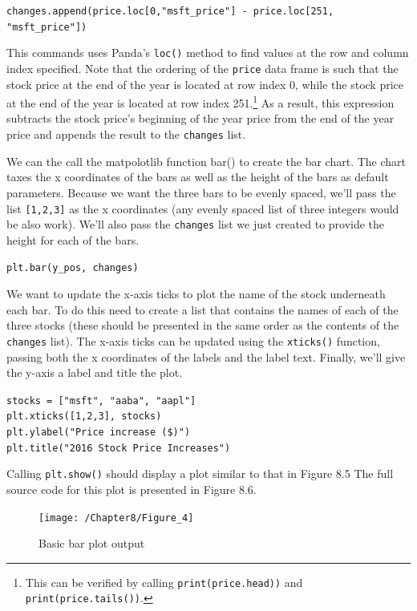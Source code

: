 \documentclass{book}
\begin{document}
\texttt{changes.append(price.loc[0,"msft\_price"] - price.loc[251,\\
	"msft\_price"])}

This commands uses Panda's \texttt{loc()} method to find values at the row and column index specified. Note that the ordering of the \texttt{price} data frame is such that the stock price at the end of the year is located at row index 0, while the stock price at the end of the year is located at row index 251.\footnote{This can be verified by calling \texttt{print(price.head))} and \texttt{print(price.tails())}.} As a result, this expression subtracts the stock price's beginning of the year price from the end of the year price and appends the result to the \texttt{changes} list. 

We can the call the matpolotlib function {bar()} to create the bar chart. The chart taxes the x coordinates of the bars as well as the height of the bars as default parameters. Because we want the three bars to be evenly spaced, we'll pass the list \texttt{[1,2,3]} as the x coordinates (any evenly spaced list of three integers would be also work). We'll also pass the \texttt{changes} list we just created to provide the height for each of the bars.

\texttt{plt.bar(y\_pos, changes)}

We want to update the x-axis ticks to plot the name of the stock underneath each bar. To do this need to create a list that contains the names of each of the three stocks (these should be presented in the same order as the contents of the \texttt{changes} list). The x-axis ticks can be updated using the \texttt{xticks()} function, passing both the x coordinates of the labels and the label text. Finally, we'll give the y-axis a label and title the plot.

\texttt{stocks = ["msft", "aaba", "aapl"]\\plt.xticks([1,2,3], stocks)\\plt.ylabel("Price increase (\$)")\\plt.title("2016 Stock Price Increases")}

Calling \texttt{plt.show()} should display a plot similar to that in Figure 8.5 The full source code for this plot is presented in Figure 8.6.

\begin{figure}[h]
	\caption{Basic bar plot output}
	\centering\texttt{[image: /Chapter8/Figure\_4]}
\end{figure}
\end{document}
